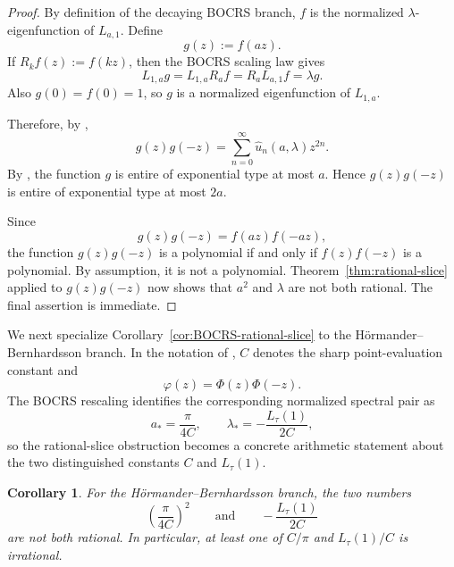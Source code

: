 \documentclass[11pt,letterpaper]{amsart}
\numberwithin{equation}{section}
\theoremstyle{plain}
\newtheorem{corollary}[theorem]{Corollary}
\theoremstyle{remark}
\begin{document}
\begin{proof}
By definition of the decaying BOCRS branch, \(f\) is the normalized \(\lambda\)-eigenfunction
of \(L_{a,1}\). Define
\[
g(z):=f(az).
\]
If \(R_kf(z):=f(kz)\), then the BOCRS scaling law \cite[\S4]{BOCRS} gives
\[
L_{1,a}g=L_{1,a}R_af=R_aL_{a,1}f=\lambda g.
\]
Also \(g(0)=f(0)=1\), so \(g\) is a normalized eigenfunction of \(L_{1,a}\).

Therefore, by \cite[\S10.3]{BOCRS},
\[
g(z)g(-z)=\sum_{n=0}^{\infty}\widehat u_n(a,\lambda)z^{2n}.
\]
By \cite[Corollary~7.2]{BOCRS}, the function \(g\) is entire of exponential type at most
\(a\). Hence \(g(z)g(-z)\) is entire of exponential type at most \(2a\).

Since
\[
g(z)g(-z)=f(az)f(-az),
\]
the function \(g(z)g(-z)\) is a polynomial if and only if \(f(z)f(-z)\) is a polynomial.
By assumption, it is not a polynomial. Theorem~\ref{thm:rational-slice} applied to
\(g(z)g(-z)\) now shows that \(a^2\) and \(\lambda\) are not both rational. The final
assertion is immediate.
\end{proof}

We next specialize Corollary~\ref{cor:BOCRS-rational-slice} to the
H\"ormander--Bernhardsson branch. In the notation of \cite{BOCRS}, \(C\) denotes the sharp
point-evaluation constant and
\[
\varphi(z)=\Phi(z)\Phi(-z).
\]
The BOCRS rescaling identifies the corresponding normalized spectral pair as
\[
a_*=\frac{\pi}{4C},
\qquad
\lambda_*=-\frac{L_\tau(1)}{2C},
\]
so the rational-slice obstruction becomes a concrete arithmetic statement about the two
distinguished constants \(C\) and \(L_\tau(1)\).

\begin{corollary}\label{cor:HB-normalized-obstruction}
For the Hörmander--Bernhardsson branch, the two numbers
\[
\left(\frac{\pi}{4C}\right)^2
\qquad\text{and}\qquad
-\frac{L_{\tau}(1)}{2C}
\]
are not both rational. In particular, at least one of $C/\pi$ and $L_{\tau}(1)/C$ is irrational.
\end{corollary}
\end{document}
